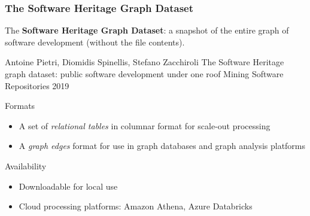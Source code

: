 \documentclass[aspectratio=169,xcolor=table]{beamer}
\begin{document}
    \begin{frame}
        \frametitle{The Software Heritage Graph Dataset}

        \begin{block}{}
            The \textbf{Software Heritage Graph Dataset}: a snapshot of the
            entire graph of software development (without the file contents).

            \footnotesize
            \begin{thebibliography}{msr2019}
                 Antoine Pietri, Diomidis Spinellis, Stefano Zacchiroli\newblock
                The Software Heritage graph dataset: public software development under one roof\newblock
                Mining Software Repositories 2019\newblock
            \end{thebibliography}
        \end{block}

        \begin{block}{Formats}
            \begin{itemize}
                \item A set of \emph{relational tables} in columnar format for
                    scale-out processing
                \item A \emph{graph edges} format for use in graph databases
                    and graph analysis platforms
            \end{itemize}
        \end{block}

        \begin{block}{Availability}
            \begin{itemize}
                \item Downloadable for local use
                \item Cloud processing platforms: Amazon Athena, Azure
                    Databricks
            \end{itemize}
        \end{block}
    \end{frame}
\end{document}
